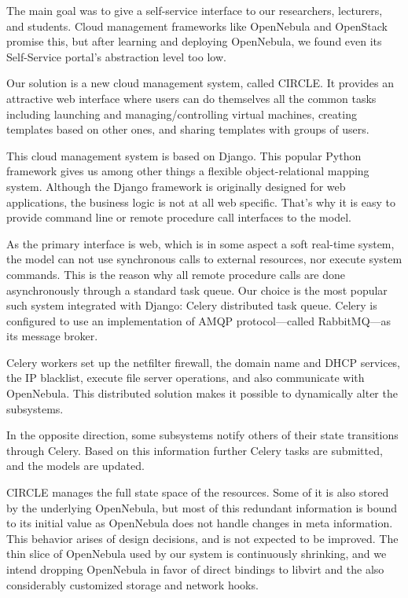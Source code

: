 \documentclass{llncs}
\begin{document}
   The main goal was to give a self-service interface to our researchers, lecturers, and students.
   Cloud management frameworks like OpenNebula and OpenStack promise this, but after learning and deploying OpenNebula, we found even its Self-Service portal's abstraction level too low.

   Our solution is a new cloud management system, called CIRCLE. It provides an attractive web interface where users can do themselves all the common tasks including launching and managing/controlling virtual machines, creating templates based on other ones, and sharing templates with groups of users.

   This cloud management system is based on Django\cite{holovaty2009definitive}. This popular Python framework gives us among other things a flexible object-relational mapping system. Although the Django framework is originally designed for web applications, the business logic is not at all web specific. That's why it is easy to provide command line or remote procedure call interfaces to the model.

   As the primary interface is web, which is in some aspect a soft real-time system, the model can not use synchronous calls to external resources, nor execute system commands. This is the reason why all remote procedure calls are done asynchronously through a standard task queue. Our choice is the most popular such system integrated with Django: Celery distributed task queue. Celery is configured to use an implementation of AMQP\cite{vinoski2006advanced} protocol---called RabbitMQ---as its message broker.

   Celery workers set up the netfilter firewall, the domain name and DHCP services, the IP blacklist, execute file server operations, and also communicate with OpenNebula. This distributed solution makes it possible to dynamically alter the subsystems.

   In the opposite direction, some subsystems notify others of their state transitions through Celery. Based on this information further Celery tasks are submitted, and the models are updated.

   CIRCLE manages the full state space of the resources. Some of it is also stored by the underlying OpenNebula, but most of this redundant information is bound to its initial value as OpenNebula does not handle changes in meta information. This behavior arises of design decisions, and is not expected to be improved. The thin slice of OpenNebula used by our system is continuously shrinking, and we intend dropping OpenNebula in favor of direct bindings to libvirt and the also considerably customized storage and network hooks.
\end{document}
